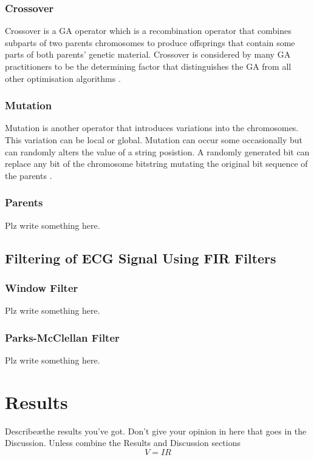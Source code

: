 \documentclass[a4paper, 11pt]{article}
\begin{document}
        \subsubsection{Crossover}
            Crossover is a GA operator which is a recombination operator that combines subparts of two parents 
            chromosomes to produce offsprings that contain some parts of both parents' genetic material. Crossover
            is considered by many GA practitioners to be the determining factor that distinguishes the GA from
            all other optimisation algorithms \cite{Tang1996}.

        \subsubsection{Mutation}
            Mutation is another operator that introduces variations into the chromosomes. This variation can be
            local or global. Mutation can occur some occasionally but can randomly alters the value of a string
            posistion. A randomly generated bit can replace any bit of the chromosome bitstring mutating the original
            bit sequence of the parents \cite{Tang1996}.

        \subsubsection{Parents}
            Plz write something here.

    \subsection{Filtering of ECG Signal Using FIR Filters}\label{sec:meth_sub5}
        \subsubsection{Window Filter}
            Plz write something here.

        \subsubsection{Parks-McClellan Filter}
            Plz write something here.


\section{Results}\label{sec:res}
    Describe\ae the results you've got. Don't give your opinion in here that goes in the Discussion.
    Unless combine the Results and Discussion sections \begin{equation} V = IR\end{equation}
\end{document}
